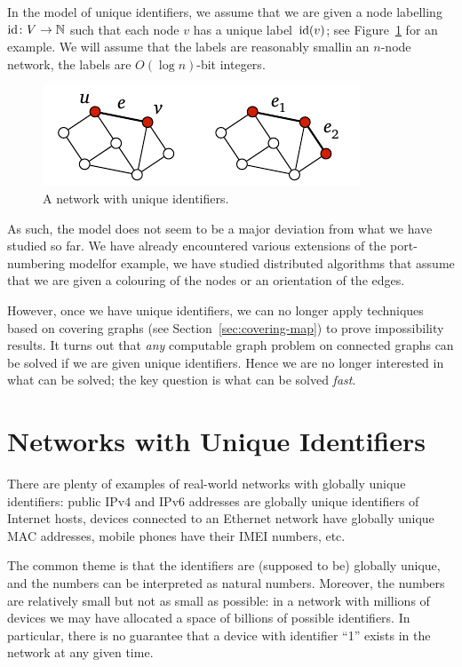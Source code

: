 In the model of unique identifiers, we assume that we are given a node labelling $\operatorname{id}\colon V \to \mathbb{N}$ such that each node $v$ has a unique label~$\operatorname{id}(v)$; see Figure~\ref{fig:unique-ids} for an example. We will assume that the labels are reasonably small\mydash in an $n$-node network, the labels are $O(\log n)$-bit integers.

\begin{figure}
    \centering
    \includegraphics[page=\PUniqueIds]{figs.pdf}
    \caption{A network with unique identifiers.}\label{fig:unique-ids}
\end{figure}

As such, the model does not seem to be a major deviation from what we have studied so far. We have already encountered various extensions of the port-numbering model\mydash for example, we have studied distributed algorithms that assume that we are given a colouring of the nodes or an orientation of the edges.

However, once we have unique identifiers, we can no longer apply techniques based on covering graphs (see Section~\ref{sec:covering-map}) to prove impossibility results. It turns out that \emph{any} computable graph problem on connected graphs can be solved if we are given unique identifiers. Hence we are no longer interested in what can be solved; the key question is what can be solved \emph{fast}.


\section{Networks with Unique Identifiers}

There are plenty of examples of real-world networks with globally unique identifiers: public IPv4 and IPv6 addresses are globally unique identifiers of Internet hosts, devices connected to an Ethernet network have globally unique MAC addresses, mobile phones have their IMEI numbers, etc.

The common theme is that the identifiers are (supposed to be) globally unique, and the numbers can be interpreted as natural numbers. Moreover, the numbers are relatively small but not as small as possible: in a network with millions of devices we may have allocated a space of billions of possible identifiers. In particular, there is no guarantee that a device with identifier ``1'' exists in the network at any given time.

